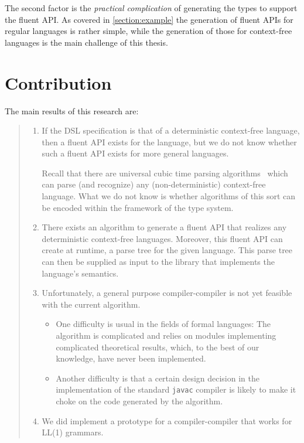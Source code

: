 The second factor is the \emph{practical complication} of generating the \Java types to
support the fluent API. As covered in \cref{section:example} the generation of
fluent APIs for regular languages is rather simple, while the generation of
those for context-free languages is the main challenge of this thesis.

\section{Contribution}
\label{section:contribution}
The main results of this research are:
\begin{quote}
  \begin{enumerate}
  \item 
    If the DSL specification is that of a deterministic context-free language,
    then a fluent API exists for the language, but we do not know whether such
    a fluent API exists for more general languages.
    \par
    Recall that there are universal cubic time parsing
    algorithms~\cite{Cocke:1969,Earley:1970,Younger:1967} which can parse (and
    recognize) any (non-deterministic) context-free language. What we do not
    know is whether algorithms of this sort can be encoded within the framework
    of the \Java type system.
  \item
    There exists an algorithm to generate a fluent API that realizes any
    deterministic context-free languages. Moreover, this fluent API can create
    at runtime, a parse tree for the given language. This parse tree can then
    be supplied as input to the library that implements the language's
    semantics.
  \item
    Unfortunately, a general purpose compiler-compiler is not yet feasible with
    the current algorithm.
    \begin{itemize}
      \item 
        One difficulty is usual in the fields of formal languages: The
        algorithm is complicated and relies on modules implementing complicated
        theoretical results, which, to the best of our knowledge, have never
        been implemented.
      \item
        Another difficulty is that a certain design decision in the
        implementation of the standard \texttt{javac} compiler is likely to
        make it choke on the \Java code generated by the algorithm.
    \end{itemize}
  \item
    We did implement a prototype for a compiler-compiler that works for LL(1)
    grammars.
  \end{enumerate}
\end{quote}

